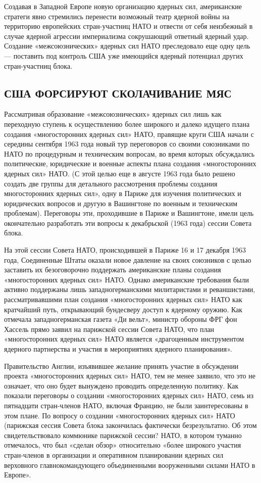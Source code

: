 \documentclass[12pt, a4paper, openany]{book}
\begin{document}
Создавая в Западной Европе новую организацию ядерных сил, американские стратеги явно стремились перенести возможный театр ядерной войны на территорию европейских стран-участниц НАТО и отвести от себя неизбежный в случае ядерной агрессии империализма сокрушающий ответный ядерный удар. Создание «межсоюзнических» ядерных сил НАТО преследовало еще одну цель — поставить под контроль США уже имеющийся ядерный потенциал других стран-участниц блока.
	

\subsection[США форсируют сколачивание МЯС]{\center США ФОРСИРУЮТ СКОЛАЧИВАНИЕ МЯС}	
	
Рассматривая образование «межсоюзнических» ядерных сил лишь как переходную ступень к осуществлению более широкого и далеко идущего плана создания «многосторонних ядерных сил» НАТО, правящие круги США начали с середины сентября 1963 года новый тур переговоров со своими союзниками по НАТО по процедурным и техническим вопросам, во время которых обсуждались политические, юридические и военные аспекты плана создания «многосторонних ядерных сил» НАТО. (С этой целью еще в августе 1963 года было решено создать две группы для детального рассмотрения проблемы создания многосторонних ядерных сил», одну в Париже для изучения политических и юридических вопросов и другую в Вашингтоне по военным и техническим проблемам). Переговоры эти, проходившие в Париже и Вашингтоне, имели цель окончательно разработать эти вопросы к декабрьской (1963 года) сессии Совета блока.
	
На этой сессии Совета НАТО, происходившей в Париже 16 и 17 декабря 1963 года, Соединенные Штаты оказали новое давление на своих союзников с целью заставить их безоговорочно поддержать американские планы создания «многосторонних ядерных сил» НАТО. Однако американские требования были активно поддержаны лишь западногерманскими милитаристами и реваншистами, рассматривавшими план создания «многосторонних ядерных сил» НАТО как кратчайший путь, открывающий бундесверу доступ к ядерному оружию. Как отмечала западногерманская газета «Ди вельт», министр обороны ФРГ фон Хассель прямо заявил на парижской сессии Совета НАТО, что план «многосторонних ядерных сил» НАТО является «драгоценным инструментом ядерного партнерства и участия в мероприятиях ядерного планирования».
	
Правительство Англии, изъявившее желание принять участие в обсуждении проекта «многосторонних ядерных сил» НАТО, тем не менее заявило, что это не означает, что оно будет вынуждено проводить определенную политику. Как показали переговоры о создании «многосторонних ядерных сил» НАТО, семь из пятнадцати стран-членов НАТО, включая Францию, не были заинтересованы в этом плане. По вопросу о создании «многосторонних ядерных сил» НАТО (парижская сессия Совета блока закончилась фактически безрезультатно. Об этом свидетельствовало коммюнике парижской сессии? НАТО, в котором туманно отмечалось, что был «сделан обзор» относительно «более широкого участия стран-членов в организации и оперативном планировании ядерных сил верховного главнокомандующего объединенными вооруженными силами НАТО в Европе».
	
\end{document}
